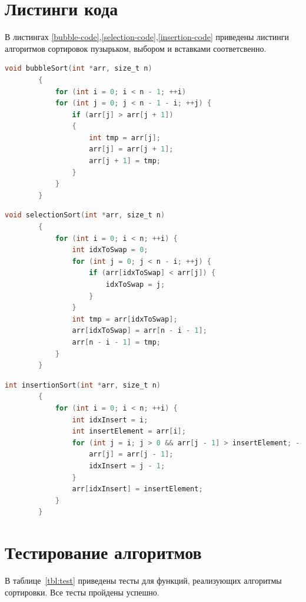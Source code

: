 \documentclass[a4paper,12pt]{report}
\begin{document}
	\section{Листинги кода}
	
	В листингах \ref{bubble-code},\ref{selection-code},\ref{insertion-code} приведены листинги алгоритмов сортировок пузырьком, выбором и вставками соответсвенно.
	
	\begin{lstlisting}[label=bubble-code,caption=Функция сортировки массива пузырьком,language=C]
		void bubbleSort(int *arr, size_t n)
		{
			for (int i = 0; i < n - 1; ++i)
			for (int j = 0; j < n - 1 - i; ++j) {
				if (arr[j] > arr[j + 1])
				{
					int tmp = arr[j];
					arr[j] = arr[j + 1];
					arr[j + 1] = tmp;
				}
			}
		}
	\end{lstlisting}

	
	\begin{lstlisting}[label=selection-code,caption=Функция сортировки массива выбором,language=C]
		void selectionSort(int *arr, size_t n)
		{
			for (int i = 0; i < n; ++i) {
				int idxToSwap = 0;
				for (int j = 0; j < n - i; ++j) {
					if (arr[idxToSwap] < arr[j]) {
						idxToSwap = j;
					}
				}
				int tmp = arr[idxToSwap];
				arr[idxToSwap] = arr[n - i - 1];
				arr[n - i - 1] = tmp;
			}
		}
	\end{lstlisting}

	\begin{lstlisting}[label=insertion-code,caption=Функция сортировки массива вставками,language=C]
		int insertionSort(int *arr, size_t n)
		{
			for (int i = 0; i < n; ++i) {
				int idxInsert = i;
				int insertElement = arr[i];
				for (int j = i; j > 0 && arr[j - 1] > insertElement; --j) {
					arr[j] = arr[j - 1];
					idxInsert = j - 1;
				}
				arr[idxInsert] = insertElement;
			}
		}
	\end{lstlisting}

	\section{Тестирование алгоритмов}

	В таблице~\ref{tbl:test} приведены тесты для функций, реализующих алгоритмы сортировки. Все тесты пройдены успешно.
	
\end{document}
